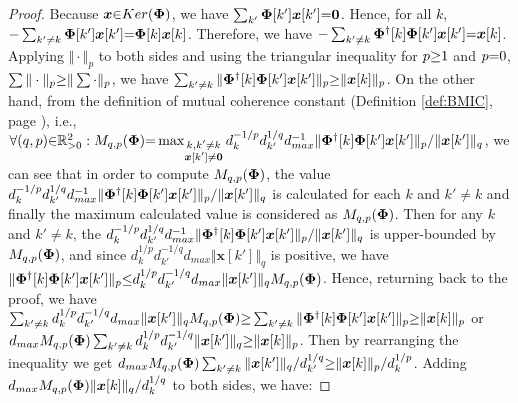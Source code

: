 \begin{proof}
Because $\boldsymbol{x} {\in} Ker(\boldsymbol{\Phi})$, we have $\sum_{k'} \boldsymbol{\Phi}[k']\boldsymbol{x}[k'] {=} \boldsymbol{0}$. 
Hence, for all $k$, $-\sum_{k' \neq k} \boldsymbol{\Phi}[k']\boldsymbol{x}[k'] {=} \boldsymbol{\Phi}[k]\boldsymbol{x}[k]$. 
Therefore,  we have $-\sum_{k' \neq k} \boldsymbol{\Phi}^\dagger[k] \boldsymbol{\Phi}[k']\boldsymbol{x}[k'] {=}\boldsymbol{x}[k]$.
Applying $\Vert \cdot \Vert_{p}$ to both sides and using the triangular inequality for $p {\geq} 1$ and $p {=} 0$, $ \sum{\Vert \cdot \Vert_p} {\geq} \Vert \sum{\cdot} \Vert_p$, we have $\sum_{k' \neq k} \Vert \boldsymbol{\Phi}^\dagger[k]\boldsymbol{\Phi}[k']\boldsymbol{x}[k'] \Vert_{p} {\geq} \Vert \boldsymbol{x}[k] \Vert_{p}$. 
On the other hand, from the definition of mutual coherence constant (Definition \ref{def:BMIC}, page \pageref{def:BMIC}), i.e., $\forall (q , p) {\in} \mathbb{R}^2_{>0} : M_{q,p}(\boldsymbol{\Phi}) {=} \max_{\substack{k,k' \neq k \\ \boldsymbol{x}[k'] \neq \boldsymbol{0}}} d_k^{-1/p} d_{k'}^{1/q} d_{max}^{-1} \Vert \boldsymbol{\Phi}^\dagger[k]\boldsymbol{\Phi}[k']\boldsymbol{x}[k'] \Vert_{p} / \Vert \boldsymbol{x}[k'] \Vert_{q}$, we can see that in order to compute $M_{q,p}(\boldsymbol{\Phi})$, the value $d_k^{-1/p} d_{k'}^{1/q} d_{max}^{-1} \Vert \boldsymbol{\Phi}^\dagger[k]\boldsymbol{\Phi}[k']\boldsymbol{x}[k'] \Vert_{p} / \Vert \boldsymbol{x}[k'] \Vert_{q}$ is calculated for each $k$ and $k' {\neq} k$ and finally the maximum calculated value is considered as $M_{q,p}(\boldsymbol{\Phi})$.
Then for any $k$ and $k' {\neq} k$, the $d_k^{-1/p} d_{k'}^{1/q} d_{max}^{-1} \Vert \boldsymbol{\Phi}^\dagger[k]\boldsymbol{\Phi}[k']\boldsymbol{x}[k'] \Vert_{p} / \Vert \boldsymbol{x}[k'] \Vert_{q}$ is upper-bounded by $M_{q,p}(\boldsymbol{\Phi})$, and since $d_k^{1/p} d_{k'}^{-1/q} d_{max} \Vert \boldsymbol{x}[k'] \Vert_{q}$ is positive, we have $\Vert \boldsymbol{\Phi}^\dagger[k]\boldsymbol{\Phi}[k']\boldsymbol{x}[k'] \Vert_{p} {\leq} d_k^{1/p} d_{k'}^{-1/q} d_{max} \Vert \boldsymbol{x}[k'] \Vert_{q} M_{q,p}(\boldsymbol{\Phi})$.
Hence, returning back to the proof, we have $\sum_{k' \neq k} d_k^{1/p} d_{k'}^{-1/q} d_{max} \Vert \boldsymbol{x}[k'] \Vert_{q} M_{q,p}(\boldsymbol{\Phi}) {\geq} \sum_{k' \neq k} \Vert \boldsymbol{\Phi}^\dagger[k]\boldsymbol{\Phi}[k']\boldsymbol{x}[k'] \Vert_{p} {\geq} \Vert \boldsymbol{x}[k] \Vert_{p}$ or $d_{max} M_{q,p}(\boldsymbol{\Phi}) \sum_{k' \neq k} d_k^{1/p} d_{k'}^{-1/q} \Vert \boldsymbol{x}[k'] \Vert_{q} {\geq} \Vert \boldsymbol{x}[k] \Vert_{p}$.
Then by rearranging the inequality we get $d_{max} M_{q,p}(\boldsymbol{\Phi}) \sum_{k' \neq k} \Vert\boldsymbol{x}[k'] \Vert_{q} / d^{1/q}_{k'} {\geq} \Vert \boldsymbol{x}[k] \Vert_{p} / d^{1/p}_k$.
Adding $d_{max} M_{q,p}(\boldsymbol{\Phi}) \Vert \boldsymbol{x}[k] \Vert_{q} / d^{1/q}_{k}$ to both sides, we have:

\end{proof}
